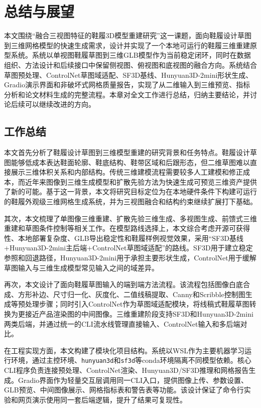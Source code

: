 
\chapter{总结与展望}

本文围绕“融合三视图特征的鞋履3D模型重建研究”这一课题，面向鞋履设计草图到三维网格模型的快速生成需求，设计并实现了一个本地可运行的鞋履三维重建原型系统。系统以单视图鞋履草图到三维GLB模型作为当前稳定闭环，同时在数据组织、方法设计和后续接口中保留侧视图、俯视图和底视图的融合方向。系统结合草图预处理、ControlNet草图域适配、SF3D基线、Hunyuan3D-2mini形状生成、Gradio演示界面和非破坏式网格质量报告，实现了从二维输入到三维预览、指标分析和论文材料生成的完整流程。本章对全文工作进行总结，归纳主要结论，并讨论后续可以继续改进的方向。

\section{工作总结}

本文首先分析了鞋履设计草图到三维模型重建的研究背景和任务特点。鞋履设计草图能够低成本表达鞋面轮廓、鞋底结构、鞋带区域和后跟形态，但二维草图难以直接展示三维体积关系和内部结构。传统三维建模流程需要较多人工建模和修正成本，而近年来图像到三维生成模型和扩散先验方法为快速生成可预览三维资产提供了新的可能。基于这一背景，本文将研究目标定位为在本地硬件条件下构建可运行的鞋履外观级三维网格生成系统，并为三视图融合和结构约束继续扩展打下基础。

其次，本文梳理了单图像三维重建、扩散先验三维生成、多视图生成、前馈式三维重建和草图条件控制等相关工作。在模型路线选择上，本文综合考虑开源可获得性、本地部署复杂度、GLB导出稳定性和鞋履样例视觉效果，采用“SF3D基线+Hunyuan3D-2mini主后端+ControlNet草图域适配”的路线。SF3D用于建立稳定参照和回退路径，Hunyuan3D-2mini用于承担主要形状生成，ControlNet用于缓解草图输入与三维生成模型常见输入之间的域差异。

再次，本文设计了面向鞋履草图输入的端到端方法流程。该流程包括图像白底合成、方形补边、尺寸归一化、灰度化、二值线稿提取、Canny和Scribble控制图生成等预处理步骤；同时引入ControlNet作为草图域适配模块，将线稿式鞋履草图转换为更接近产品渲染图的中间图像。三维重建阶段支持SF3D和Hunyuan3D-2mini两类后端，并通过统一的CLI流水线管理直接输入、ControlNet输入和多后端对比。

在工程实现方面，本文构建了模块化项目结构。系统以WSL作为主要机器学习运行环境，通过主控环境、\texttt{hunyuan3d}和\texttt{sf3d}等conda环境隔离不同模型依赖。核心CLI程序负责连接预处理、ControlNet渲染、Hunyuan3D/SF3D推理和网格报告生成。Gradio界面作为轻量交互层调用同一CLI入口，提供图像上传、参数设置、GLB预览、中间图像展示、网格指标表和警告表等功能。该设计保证了命令行实验和网页演示使用同一套后端逻辑，提升了结果可复现性。

